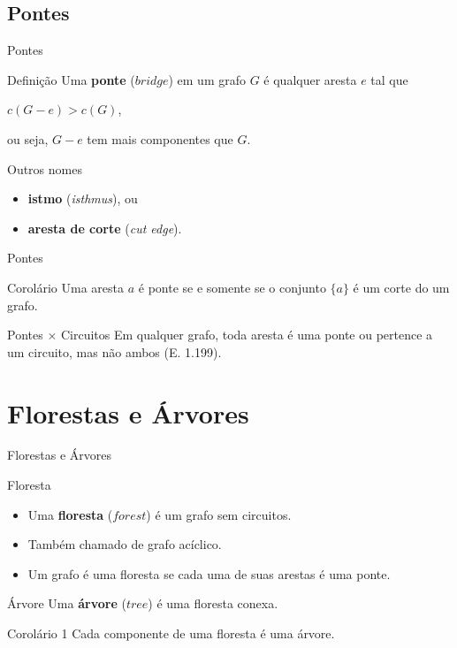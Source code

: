 \documentclass[xcolor=dvipsnames,table]{beamer}
\begin{document}
	\subsection{Pontes}
	\begin{frame}{Pontes}
		\begin{block}{Definição}
			Uma {\bf ponte} ($bridge$) em um grafo $G$ é qualquer aresta $e$ tal que 
			\begin{center}
				$c(G - e) > c(G)$,  
			\end{center}
			ou seja, $G - e$ tem mais componentes que $G$.				
		\end{block}  
		\begin{block}{Outros nomes}
			\begin{itemize}
				\item {\bf istmo} ({\it isthmus}), ou 
				\item {\bf aresta de corte} ({\it cut edge}).
			\end{itemize}
		\end{block}
	\end{frame}
	
	\begin{frame}{Pontes}
		\begin{block}{Corolário}
			Uma aresta $a$ é ponte se e somente se o conjunto $\{ a \}$ é um corte do um grafo.
		\end{block}  
		\begin{block}{Pontes $\times$ Circuitos}
			Em qualquer grafo, toda aresta é uma ponte ou pertence a um circuito, mas não ambos (E. 1.199).
		\end{block}
	\end{frame}

	\section{Florestas e Árvores}
	\begin{frame}{Florestas e Árvores}
		\begin{block}{Floresta}
			\begin{itemize}
				\item Uma {\bf floresta} ($forest$) é um grafo sem circuitos. \pause
				\item Também chamado de grafo acíclico. \pause
				\item Um grafo é uma floresta se cada uma de suas arestas é uma ponte. 
			\end{itemize}
		\end{block} \pause
		\begin{block}{Árvore}
			Uma {\bf árvore} ($tree$) é uma floresta conexa. 
		\end{block} \pause
		\begin{block}{Corolário 1}
			Cada componente de uma floresta é uma árvore.
		\end{block}
	\end{frame}
	
\end{document}
